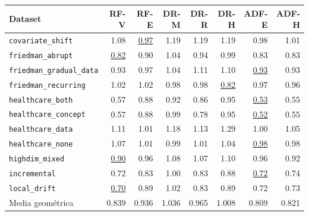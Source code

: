 \begin{tabular*}{\textwidth}{@{\extracolsep{\fill}} l rrrrrrr}
\toprule
Dataset & {RF-V} & {RF-E} & {DR-M} & {DR-R} & {DR-H} & {ADF-E} & {ADF-H} \\
\midrule
\texttt{covariate\_shift} & 1.08 & \underline{0.97} & 1.19 & 1.19 & 1.19 & 0.98 & 1.01 \\
\texttt{friedman\_abrupt} & \underline{0.82} & 0.90 & 1.04 & 0.94 & 0.99 & 0.83 & 0.83 \\
\texttt{friedman\_gradual\_data} & 0.93 & 0.97 & 1.04 & 1.11 & 1.10 & \underline{0.93} & 0.93 \\
\texttt{friedman\_recurring} & 1.02 & 1.02 & 0.98 & 0.98 & \underline{0.82} & 0.97 & 0.96 \\
\texttt{healthcare\_both} & 0.57 & 0.88 & 0.92 & 0.86 & 0.95 & \underline{0.53} & 0.55 \\
\texttt{healthcare\_concept} & 0.57 & 0.88 & 0.99 & 0.78 & 0.95 & \underline{0.52} & 0.55 \\
\texttt{healthcare\_data} & 1.11 & 1.01 & 1.18 & 1.13 & 1.29 & 1.00 & 1.05 \\
\texttt{healthcare\_none} & 1.07 & 1.01 & 0.99 & 1.01 & 1.04 & \underline{0.98} & 0.98 \\
\texttt{highdim\_mixed} & \underline{0.90} & 0.96 & 1.08 & 1.07 & 1.10 & 0.96 & 0.92 \\
\texttt{incremental} & 0.72 & 0.83 & 1.00 & 0.83 & 0.88 & \underline{0.72} & 0.74 \\
\texttt{local\_drift} & \underline{0.70} & 0.89 & 1.02 & 0.83 & 0.89 & 0.72 & 0.73 \\
\midrule
Media geométrica & 0.839 & 0.936 & 1.036 & 0.965 & 1.008 & 0.809 & 0.821 \\
\bottomrule
\end{tabular*}

